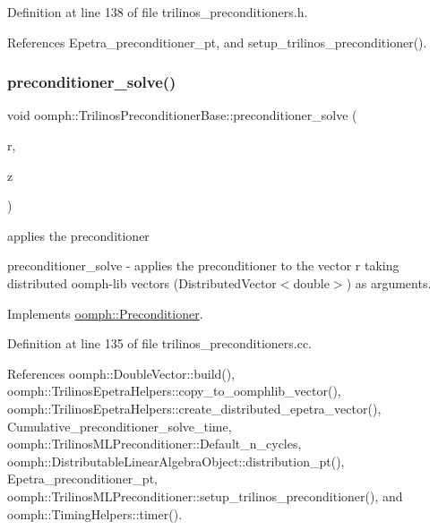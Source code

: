 Definition at line 138 of file trilinos\+\_\+preconditioners.\+h.



References Epetra\+\_\+preconditioner\+\_\+pt, and setup\+\_\+trilinos\+\_\+preconditioner().

\mbox{\label{classoomph_1_1TrilinosPreconditionerBase_a12ec6cf14b8d27ed9ef810dcad5e1182}} 
\subsubsection{\texorpdfstring{preconditioner\+\_\+solve()}{preconditioner\_solve()}}
{\footnotesize\ttfamily void oomph\+::\+Trilinos\+Preconditioner\+Base\+::preconditioner\+\_\+solve (\begin{DoxyParamCaption}\item[{const \hyperlink{classoomph_1_1DoubleVector}{Double\+Vector} \&}]{r,  }\item[{\hyperlink{classoomph_1_1DoubleVector}{Double\+Vector} \&}]{z }\end{DoxyParamCaption})\hspace{0.3cm}{\ttfamily [virtual]}}



applies the preconditioner 

preconditioner\+\_\+solve -\/ applies the preconditioner to the vector r taking distributed oomph-\/lib vectors (Distributed\+Vector$<$double$>$) as arguments. 

Implements \hyperlink{classoomph_1_1Preconditioner_ace1199369e4465cd2b9a34884bb64ec8}{oomph\+::\+Preconditioner}.



Definition at line 135 of file trilinos\+\_\+preconditioners.\+cc.



References oomph\+::\+Double\+Vector\+::build(), oomph\+::\+Trilinos\+Epetra\+Helpers\+::copy\+\_\+to\+\_\+oomphlib\+\_\+vector(), oomph\+::\+Trilinos\+Epetra\+Helpers\+::create\+\_\+distributed\+\_\+epetra\+\_\+vector(), Cumulative\+\_\+preconditioner\+\_\+solve\+\_\+time, oomph\+::\+Trilinos\+M\+L\+Preconditioner\+::\+Default\+\_\+n\+\_\+cycles, oomph\+::\+Distributable\+Linear\+Algebra\+Object\+::distribution\+\_\+pt(), Epetra\+\_\+preconditioner\+\_\+pt, oomph\+::\+Trilinos\+M\+L\+Preconditioner\+::setup\+\_\+trilinos\+\_\+preconditioner(), and oomph\+::\+Timing\+Helpers\+::timer().



